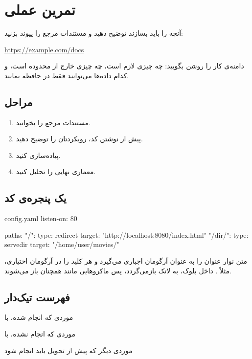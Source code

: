\section{تمرین عملی}

آنچه را باید بسازند توضیح دهید و مستندات مرجع را پیوند بزنید:

\url{https://example.com/docs}

دامنه‌ی کار را روشن بگویید: چه چیزی لازم است، چه چیزی خارج از محدوده است، و
کدام داده‌ها می‌توانند فقط در حافظه بمانند.

\subsection{مراحل}

\begin{enumerate}
    \item مستندات مرجع را بخوانید.
    \item پیش از نوشتن کد، رویکردتان را توضیح دهید.
    \item پیاده‌سازی کنید.
    \item معماری نهایی را تحلیل کنید.
\end{enumerate}

\subsection{یک پنجره‌ی کد}

\begin{neocode}[neocodetitlefont=\pixelfont]{config.yaml}
listen-on: 80

paths:
  "/":
    type: redirect
    target: "http://localhost:8080/index.html"
  "/dir/":
    type: servedir
    target: "/home/user/movies/"
\end{neocode}

 متن نوار عنوان را به عنوان آرگومان اجباری می‌گیرد و هر
کلید  را در آرگومان اختیاری، مثلاً
\lr{\texttt{[listing options=\{language=Python\}]}}. داخل بلوک،
 به لاتک بازمی‌گردد، پس ماکروهایی مانند
 همچنان باز می‌شوند.

\subsection{فهرست تیک‌دار}

\begin{neochecklist}
    \citem موردی که انجام شده، با 
    \item موردی که انجام نشده، با 
    \item موردی دیگر که پیش از تحویل باید انجام شود
\end{neochecklist}
